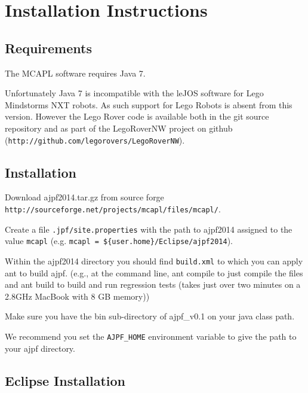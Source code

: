 \chapter{Installation Instructions}
\label{chap:installation}
\section{Requirements}

The MCAPL software requires Java 7.  

\begin{sloppypar}
Unfortunately Java 7 is incompatible with the leJOS software for Lego Mindstorms NXT robots.  As such support for Lego Robots is absent from this version.  However the Lego Rover code is available both in the git source repository and as part of the LegoRoverNW project on github (\texttt{http://github.com/legorovers/LegoRoverNW}).
\end{sloppypar}

\section{Installation}

\begin{itemize}
\begin{sloppypar}
\item Download ajpf2014.tar.gz from source forge \texttt{http://sourceforge.net/projects/mcapl/files/mcapl/}.
\end{sloppypar}
\item Create a file \texttt{.jpf/site.properties} with the path to ajpf2014 assigned to the value \texttt{mcapl} (e.g. \texttt{mcapl = \$\{user.home\}/Eclipse/ajpf2014}).
\item Within the ajpf2014 directory you should find \texttt{build.xml} to which you can apply ant to build ajpf. (e.g., at the command line, ant compile to just compile the files and ant build to build and run regression tests (takes just over two minutes on a 2.8GHz MacBook with 8 GB memory))
\item Make sure you have the bin sub-directory of ajpf\_v0.1 on your java class path.
\item We recommend you set the \texttt{AJPF\_HOME} environment variable to give the path to your ajpf directory.
\end{itemize}

\section{Eclipse Installation}

